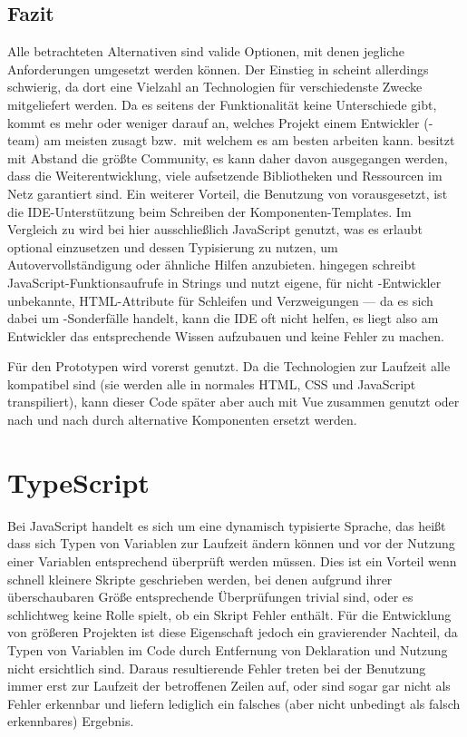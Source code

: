 \subsection{Fazit}
Alle betrachteten Alternativen sind valide Optionen, mit denen jegliche Anforderungen umgesetzt werden können. Der Einstieg in  scheint allerdings schwierig, da dort eine Vielzahl an Technologien für verschiedenste Zwecke mitgeliefert werden. Da es seitens der Funktionalität keine Unterschiede gibt, kommt es mehr oder weniger darauf an, welches Projekt einem Entwickler (-team) am meisten zusagt bzw.\ mit welchem es am besten arbeiten kann.
 besitzt mit Abstand die größte Community, es kann daher davon ausgegangen werden, dass die Weiterentwicklung, viele aufsetzende Bibliotheken und Ressourcen im Netz garantiert sind. Ein weiterer Vorteil, die Benutzung von  vorausgesetzt, ist die IDE-Unterstützung beim Schreiben der Komponenten-Templates. Im Vergleich zu  wird bei  hier ausschließlich JavaScript genutzt, was es erlaubt optional  einzusetzen und dessen Typisierung zu nutzen, um Autovervollständigung oder ähnliche Hilfen anzubieten.  hingegen schreibt JavaScript-Funktionsaufrufe in Strings und nutzt eigene, für nicht -Entwickler unbekannte, HTML-Attribute für Schleifen und Verzweigungen --- da es sich dabei um -Sonderfälle handelt, kann die IDE oft nicht helfen, es liegt also am Entwickler das entsprechende Wissen aufzubauen und keine Fehler zu machen.

Für den Prototypen wird vorerst  genutzt. Da die Technologien zur Laufzeit alle kompatibel sind (sie werden alle in normales HTML, CSS und JavaScript transpiliert), kann dieser Code später aber auch mit Vue zusammen genutzt oder nach und nach durch alternative Komponenten ersetzt werden.

\section{TypeScript}
Bei JavaScript handelt es sich um eine dynamisch typisierte Sprache, das heißt dass sich Typen von Variablen zur Laufzeit ändern können und vor der Nutzung einer Variablen entsprechend überprüft werden müssen. Dies ist ein Vorteil wenn schnell kleinere Skripte geschrieben werden, bei denen aufgrund ihrer überschaubaren Größe entsprechende Überprüfungen trivial sind, oder es schlichtweg keine Rolle spielt, ob ein Skript Fehler enthält. Für die Entwicklung von größeren Projekten ist diese Eigenschaft jedoch ein gravierender Nachteil, da Typen von Variablen im Code durch Entfernung von Deklaration und Nutzung nicht ersichtlich sind. Daraus resultierende Fehler treten bei der Benutzung immer erst zur Laufzeit der betroffenen Zeilen auf, oder sind sogar gar nicht als Fehler erkennbar und liefern lediglich ein falsches (aber nicht unbedingt als falsch erkennbares) Ergebnis.   

